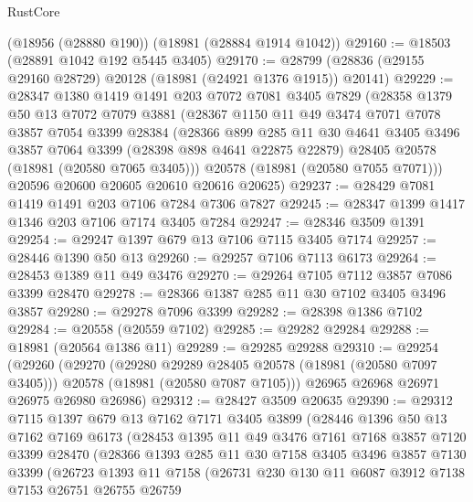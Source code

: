 \begin{lexlean}{RustCore}
\begin{coremodule}
    (@18956 (@28880 @190))
    (@18981 (@28884 @1914 @1042))
@29160 := @18503 (@28891 @1042 @192 @5445 @3405)
@29170 := @28799 (@28836 (@29155 @29160 @28729) @20128 (@18981 (@24921 @1376 @1915)) @20141)
@29229 := @28347
    @1380
    @1419
    @1491
    @203
    @7072
    @7081
    @3405
    @7829
    (@28358
      @1379
      @50
      @13
      @7072
      @7079
      @3881
      (@28367
        @1150
        @11
        @49
        @3474
        @7071
        @7078
        @3857
        @7054
        @3399
        @28384
        (@28366
          @899
          @285
          @11
          @30
          @4641
          @3405
          @3496
          @3857
          @7064
          @3399
          (@28398 @898 @4641 @22875 @22879)
          @28405
          @20578
          (@18981 (@20580 @7065 @3405)))
        @20578
        (@18981 (@20580 @7055 @7071)))
      @20596
      @20600
      @20605
      @20610
      @20616
      @20625)
@29237 := @28429 @7081 @1419 @1491 @203 @7106 @7284 @7306 @7827
@29245 := @28347 @1399 @1417 @1346 @203 @7106 @7174 @3405 @7284
@29247 := @28346 @3509 @1391
@29254 := @29247 @1397 @679 @13 @7106 @7115 @3405 @7174
@29257 := @28446 @1390 @50 @13
@29260 := @29257 @7106 @7113 @6173
@29264 := @28453 @1389 @11 @49 @3476
@29270 := @29264 @7105 @7112 @3857 @7086 @3399 @28470
@29278 := @28366 @1387 @285 @11 @30 @7102 @3405 @3496 @3857
@29280 := @29278 @7096 @3399
@29282 := @28398 @1386 @7102
@29284 := @20558 (@20559 @7102)
@29285 := @29282 @29284
@29288 := @18981 (@20564 @1386 @11)
@29289 := @29285 @29288
@29310 := @29254
    (@29260
      (@29270
        (@29280 @29289 @28405 @20578 (@18981 (@20580 @7097 @3405)))
        @20578
        (@18981 (@20580 @7087 @7105)))
      @26965
      @26968
      @26971
      @26975
      @26980
      @26986)
@29312 := @28427 @3509 @20635
@29390 := @29312
    @7115
    @1397
    @679
    @13
    @7162
    @7171
    @3405
    @3899
    (@28446
      @1396
      @50
      @13
      @7162
      @7169
      @6173
      (@28453
        @1395
        @11
        @49
        @3476
        @7161
        @7168
        @3857
        @7120
        @3399
        @28470
        (@28366
          @1393
          @285
          @11
          @30
          @7158
          @3405
          @3496
          @3857
          @7130
          @3399
          (@26723
            @1393
            @11
            @7158
            (@26731
              @230
              @130
              @11
              @6087
              @3912
              @7138
              @7153
              @26751
              @26755
              @26759

\end{coremodule}
\end{lexlean}
